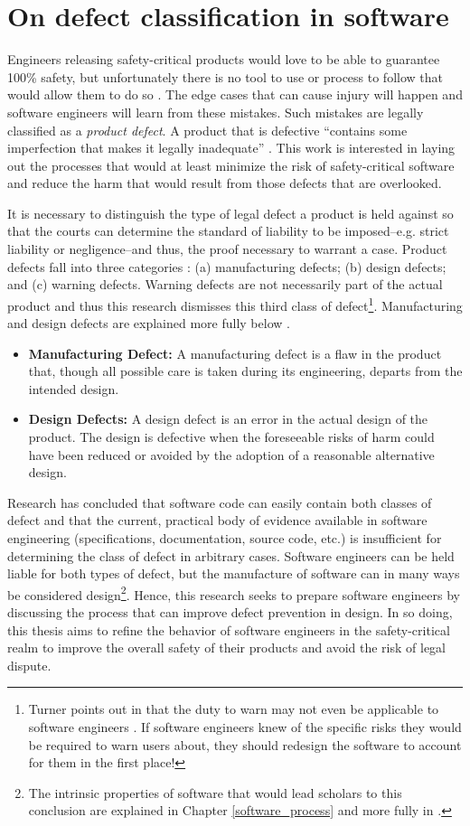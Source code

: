 \documentclass[12pt]{report}
\begin{document}
\section{On defect classification in software}
Engineers releasing safety-critical products would love to be able to guarantee 100\% safety, but unfortunately there is no tool to use or process to follow that would allow them to do so \cite{Brooks87}. The edge cases that can cause injury will happen and software engineers will learn from these mistakes. Such mistakes are legally classified as a \textit{product defect}. A product that is defective ``contains some imperfection that makes it legally inadequate'' \cite{Turner99}. This work is interested in laying out the processes that would at least minimize the risk of safety-critical software and reduce the harm that would result from those defects that are overlooked.

It is necessary to distinguish the type of legal defect a product is held against so that the courts can determine the standard of liability to be imposed--e.g. strict liability or negligence--and thus, the proof necessary to warrant a case. Product defects fall into three categories \cite{Rest3d}: (a) manufacturing defects; (b) design defects; and (c) warning defects. Warning defects are not necessarily part of the actual product and thus this research dismisses this third class of defect\footnote{Turner points out in \cite{Turner99} that the duty to warn may not even be applicable to software engineers \cite{Turner99}. If software engineers knew of the specific risks they would be required to warn users about, they should redesign the software to account for them in the first place!}. Manufacturing and design defects are explained more fully below \cite{Rest3d}. 
\begin{itemize} 
\item\textbf{Manufacturing Defect:} A manufacturing defect is a flaw in the product that, though all possible care is taken during its engineering, departs from the intended design. 
\item\textbf{Design Defects:} A design defect is an error in the actual design of the product. The design is defective when the foreseeable risks of harm could have been reduced or avoided by the adoption of a reasonable alternative design.
\end{itemize} 
Research has concluded that software code can easily contain both classes of defect and that the current, practical body of evidence available in software engineering (specifications, documentation, source code, etc.) is insufficient for determining the class of defect in arbitrary cases. Software engineers can be held liable for both types of defect, but the manufacture of software can in many ways be considered design\footnote{The intrinsic properties of software that would lead scholars to this conclusion are explained in Chapter \ref{software_process} and more fully in \cite{Turner99}.}. Hence, this research seeks to prepare software engineers by discussing the process that can improve defect prevention in design. In so doing, this thesis aims to refine the behavior of software engineers in the safety-critical realm to improve the overall safety of their products and avoid the risk of legal dispute. 
\end{document}
